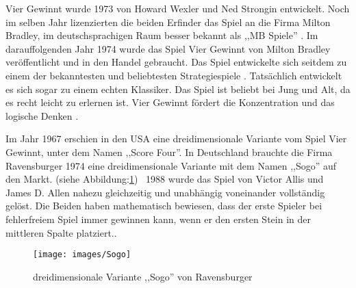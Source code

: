 Vier Gewinnt wurde 1973 von Howard Wexler und Ned Strongin entwickelt. Noch im selben Jahr lizenzierten die beiden Erfinder das Spiel an die Firma Milton Bradley, im deutschsprachigen Raum besser bekannt als ,,MB Spiele''
\autocite{gameorama_4gewinnt}\autocite{wikipedia_vier_gewinnt}.
Im darauffolgenden Jahr 1974 wurde das Spiel Vier Gewinnt von Milton Bradley veröffentlicht und in den Handel gebraucht. Das Spiel entwickelte sich seitdem zu einem der bekanntesten und beliebtesten Strategiespiele \autocite{wikipedia_vier_gewinnt}. Tatsächlich entwickelt es sich sogar zu einem echten Klassiker. Das Spiel ist beliebt bei Jung und Alt, da es recht leicht zu erlernen ist. Vier Gewinnt fördert die Konzentration und das logische Denken \autocite{50plus_vier_gewinnt}.

\newpage

Im Jahr 1967 erschien in den USA eine dreidimensionale Variante vom Spiel Vier Gewinnt, unter dem Namen ,,Score Four''. In Deutschland brauchte die Firma Ravensburger 1974 eine dreidimensionale Variante mit dem Namen ,,Sogo'' auf den Markt. (siehe Abbildung:\ref{fig:Sogo}) \
1988 wurde das Spiel von Victor Allis und James D. Allen nahezu gleichzeitig und unabhängig voneinander vollständig gelöst. Die Beiden haben mathematisch bewiesen, dass der erste Spieler bei fehlerfreiem Spiel immer gewinnen kann, wenn er den ersten Stein in der mittleren Spalte platziert.\autocite{wikipedia_vier_gewinnt}.\\
 
\begin{figure}[H]
	\centering
	\texttt{[image: images/Sogo]}
	\caption[Sogo von Ravensburger \autocite{abebooks_image}]{dreidimensionale Variante ,,Sogo'' von Ravensburger}
	\label{fig:Sogo}
\end{figure}
\newpage

